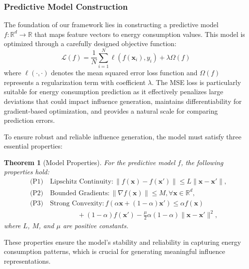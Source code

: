 \documentclass[final,5p,times,twocolumn,numbers]{elsarticle}
\newtheorem{theorem}[definition]{Theorem}
\begin{document}
\subsubsection{Predictive Model Construction}
The foundation of our framework lies in constructing a predictive model $f: \mathbb{R}^d \to \mathbb{R}$ that maps feature vectors to energy consumption values. This model is optimized through a carefully designed objective function:
\begin{equation}
    \mathcal{L}(f) = \frac{1}{N} \sum_{i=1}^N \ell(f(\mathbf{x}_i), y_i) + \lambda \Omega(f)
\end{equation}
where $\ell(\cdot,\cdot)$ denotes the mean squared error loss function and $\Omega(f)$ represents a regularization term with coefficient $\lambda$. The MSE loss is particularly suitable for energy consumption prediction as it effectively penalizes large deviations that could impact influence generation, maintains differentiability for gradient-based optimization, and provides a natural scale for comparing prediction errors.

To ensure robust and reliable influence generation, the model must satisfy three essential properties:
\begin{theorem}[Model Properties]
For the predictive model $f$, the following properties hold:
\begin{equation}
\begin{aligned}
    & \text{(P1)} \quad \text{Lipschitz Continuity}: \|f(\mathbf{x}) - f(\mathbf{x}')\| \leq L\|\mathbf{x} - \mathbf{x}'\|, \\
    & \text{(P2)} \quad \text{Bounded Gradients}: \|\nabla f(\mathbf{x})\| \leq M, \forall \mathbf{x} \in \mathbb{R}^d, \\
    & \text{(P3)} \quad \text{Strong Convexity}: f(\alpha\mathbf{x} + (1-\alpha)\mathbf{x}') \leq \alpha f(\mathbf{x}) \\ 
    & \hspace{7em} + (1-\alpha)f(\mathbf{x}') - \frac{\mu}{2}\alpha(1-\alpha)\|\mathbf{x}-\mathbf{x}'\|^2,
\end{aligned}
\end{equation}
where $L$, $M$, and $\mu$ are positive constants.
\end{theorem}

These properties ensure the model's stability and reliability in capturing energy consumption patterns, which is crucial for generating meaningful influence representations.
\end{document}
